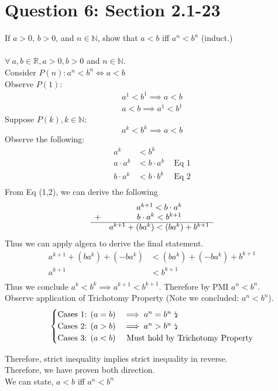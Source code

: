 \documentclass[11pt]{article}
\theoremstyle{plain}
\begin{document}
\section*{Question 6: Section 2.1-23}
If $a>0$, $b>0$, and $n \in \mathbb{N}$, show that $a<b$ iff $a^n < b^n$ (induct.) \\ \\
$\forall ~a,b \in \mathbb{R}, a>0, b>0$ and $n \in \mathbb{N}$. \\
Consider $P(n): a^n < b^n \iff a < b$ \\
Observe $P(1)$:
\[
	\begin{aligned}
		a^1 < b^1 \implies a < b \\
		a < b \implies  a^1 < b^1
	\end{aligned}
\]
Suppose $P(k), k \in \mathbb{N}$:
\[
	a^k < b^k \implies  a < b
\]
Observe the following:
\[
	\begin{aligned}
		a^k         & < b^k                        \\
		a \cdot a^k & < b \cdot a^k & \text{ Eq 1} \\
		b \cdot a^k & < b \cdot b^k & \text{ Eq 2} \\
	\end{aligned}
\]
From Eq (1,2), we can derive the following
\[
	\begin{array}{cc}
		  & a^{k+1}  < b \cdot a^k               \\
		+ & b \cdot a^k  < b^{k+1}               \\
		\hline
		  & a^{k+1} + (ba^k)  < (ba^k) + b^{k+1}
	\end{array}
\]
Thus we can apply algera to derive the final statement.
\[
	\begin{aligned}
		a^{k+1} + (ba^k) + (-ba^k) & < (ba^k) + (-ba^k) + b^{k+1} \\
		a^{k+1}                    & <  b^{k+1}                   \\
	\end{aligned}
\]
Thus we conclude $a^k < b^k \implies a^{k+1} <  b^{k+1}$. Therefore by PMI $a^n < b^n$. \\
Observe application of Trichotomy Property (Note we concluded: $a^n < b^n$).
\[
	\begin{cases}
		\text{Cases 1: } (a=b) & \implies a^n = b^n \text{ \lightning}    \\
		\text{Cases 2: } (a>b) & \implies a^n > b^n \text{ \lightning}    \\
		\text{Cases 3: } (a<b) & \text{ Must hold by Trichotomy Property} \\
	\end{cases}
\]
\begin{center}
    Therefore, strict inequality implies strict inequality in reverse.\\
    Therefore, we have proven both direction. \\
    We can state, $a<b$ iff $a^n < b^n$
\end{center}
\end{document}
